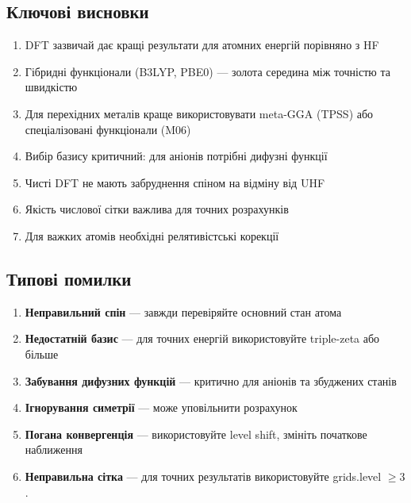 \subsection{Ключові висновки}

\begin{enumerate}
    \item DFT зазвичай дає кращі результати для атомних енергій порівняно з HF
    \item Гібридні функціонали (B3LYP, PBE0) --- золота середина між точністю та швидкістю
    \item Для перехідних металів краще використовувати meta-GGA (TPSS) або спеціалізовані функціонали (M06)
    \item Вибір базису критичний: для аніонів потрібні дифузні функції
    \item Чисті DFT не мають забруднення спіном на відміну від UHF
    \item Якість числової сітки важлива для точних розрахунків
    \item Для важких атомів необхідні релятивістські корекції
\end{enumerate}

\subsection{Типові помилки}

\begin{enumerate}
    \item \textbf{Неправильний спін} --- завжди перевіряйте основний стан атома
    \item \textbf{Недостатній базис} --- для точних енергій використовуйте triple-zeta або більше
    \item \textbf{Забування дифузних функцій} --- критично для аніонів та збуджених станів
    \item \textbf{Ігнорування симетрії} --- може уповільнити розрахунок
    \item \textbf{Погана конвергенція} --- використовуйте level shift, змініть початкове наближення
    \item \textbf{Неправильна сітка} --- для точних результатів використовуйте grids.level $\geqslant3$.
\end{enumerate}

